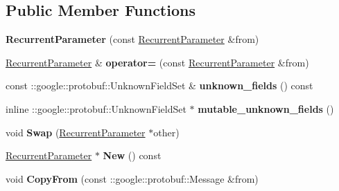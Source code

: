 \subsection*{Public Member Functions}
\begin{DoxyCompactItemize}
\item 
\mbox{\label{classcaffe_1_1_recurrent_parameter_ab226fa428771eb1493ae8e61aba47b3c}} 
{\bfseries Recurrent\+Parameter} (const \mbox{\hyperlink{classcaffe_1_1_recurrent_parameter}{Recurrent\+Parameter}} \&from)
\item 
\mbox{\label{classcaffe_1_1_recurrent_parameter_a4f241f7a1fe9f34ccd24355168c05b36}} 
\mbox{\hyperlink{classcaffe_1_1_recurrent_parameter}{Recurrent\+Parameter}} \& {\bfseries operator=} (const \mbox{\hyperlink{classcaffe_1_1_recurrent_parameter}{Recurrent\+Parameter}} \&from)
\item 
\mbox{\label{classcaffe_1_1_recurrent_parameter_a29fa7393bd7d0d4950e0d20d2451b1ea}} 
const \+::google\+::protobuf\+::\+Unknown\+Field\+Set \& {\bfseries unknown\+\_\+fields} () const
\item 
\mbox{\label{classcaffe_1_1_recurrent_parameter_ad8f9fae04ed75816d696d7a6a1dc0479}} 
inline \+::google\+::protobuf\+::\+Unknown\+Field\+Set $\ast$ {\bfseries mutable\+\_\+unknown\+\_\+fields} ()
\item 
\mbox{\label{classcaffe_1_1_recurrent_parameter_a34b79459e762ff616f60258c3c7c07d0}} 
void {\bfseries Swap} (\mbox{\hyperlink{classcaffe_1_1_recurrent_parameter}{Recurrent\+Parameter}} $\ast$other)
\item 
\mbox{\label{classcaffe_1_1_recurrent_parameter_a6ade89ee245ca3c943f412599dc69716}} 
\mbox{\hyperlink{classcaffe_1_1_recurrent_parameter}{Recurrent\+Parameter}} $\ast$ {\bfseries New} () const
\item 
\mbox{\label{classcaffe_1_1_recurrent_parameter_a5ad4ab75b74f5475496dcab8268b07c6}} 
void {\bfseries Copy\+From} (const \+::google\+::protobuf\+::\+Message \&from)
\item 

\end{DoxyCompactItemize}

